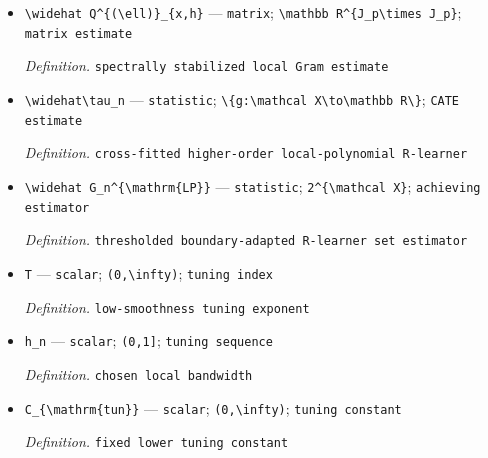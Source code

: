 \documentclass{article}
\begin{document}
\begin{itemize}
  \par\smallskip\noindent\emph{Definition.} \texttt{raw local response estimate}
  \item \texttt{\textbackslash{}\allowbreak{}widehat Q\textasciicircum{}\{(\textbackslash{}\allowbreak{}ell)\}\allowbreak{}\_\allowbreak{}\{x,\allowbreak{}h\}\allowbreak{}} --- \texttt{matrix}; \texttt{\textbackslash{}\allowbreak{}mathbb R\textasciicircum{}\{J\_\allowbreak{}p\textbackslash{}\allowbreak{}times J\_\allowbreak{}p\}\allowbreak{}}; \texttt{matrix estimate}
  \par\smallskip\noindent\emph{Definition.} \texttt{spectrally stabilized local Gram estimate}
  \item \texttt{\textbackslash{}\allowbreak{}widehat\textbackslash{}\allowbreak{}tau\_\allowbreak{}n} --- \texttt{statistic}; \texttt{\textbackslash{}\allowbreak{}\{g:\allowbreak{}\textbackslash{}\allowbreak{}mathcal X\textbackslash{}\allowbreak{}to\textbackslash{}\allowbreak{}mathbb R\textbackslash{}\allowbreak{}\}\allowbreak{}}; \texttt{CATE estimate}
  \par\smallskip\noindent\emph{Definition.} \texttt{cross-\allowbreak{}fitted higher-\allowbreak{}order local-\allowbreak{}polynomial R-\allowbreak{}learner}
  \item \texttt{\textbackslash{}\allowbreak{}widehat G\_\allowbreak{}n\textasciicircum{}\{\textbackslash{}\allowbreak{}mathrm\{LP\}\allowbreak{}\}\allowbreak{}} --- \texttt{statistic}; \texttt{2\textasciicircum{}\{\textbackslash{}\allowbreak{}mathcal X\}\allowbreak{}}; \texttt{achieving estimator}
  \par\smallskip\noindent\emph{Definition.} \texttt{thresholded boundary-\allowbreak{}adapted R-\allowbreak{}learner set estimator}
  \item \texttt{T} --- \texttt{scalar}; \texttt{(0,\allowbreak{}\textbackslash{}\allowbreak{}infty)}; \texttt{tuning index}
  \par\smallskip\noindent\emph{Definition.} \texttt{low-\allowbreak{}smoothness tuning exponent}
  \item \texttt{h\_\allowbreak{}n} --- \texttt{scalar}; \texttt{(0,\allowbreak{}1]}; \texttt{tuning sequence}
  \par\smallskip\noindent\emph{Definition.} \texttt{chosen local bandwidth}
  \item \texttt{C\_\allowbreak{}\{\textbackslash{}\allowbreak{}mathrm\{tun\}\allowbreak{}\}\allowbreak{}} --- \texttt{scalar}; \texttt{(0,\allowbreak{}\textbackslash{}\allowbreak{}infty)}; \texttt{tuning constant}
  \par\smallskip\noindent\emph{Definition.} \texttt{fixed lower tuning constant}

\end{itemize}
\end{document}
